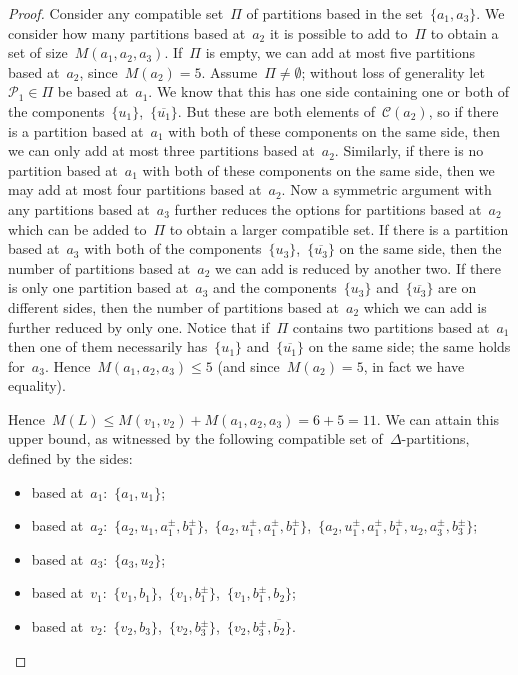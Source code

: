 \documentclass[11pt]{amsart}
\theoremstyle{definition}
\theoremstyle{definition}
\theoremstyle{definition}
\theoremstyle{definition}
\newcommand{\calC}{\mathcal{C}}
\newcommand{\calP}{\mathcal{P}} %
\begin{document}
\begin{proof}
Consider any compatible set~$\Pi$ of partitions based in the set~$\{a_1, a_3\}$. We consider how many partitions based at~$a_2$ it is possible to add to~$\Pi$ to obtain a set of size~$M(a_1, a_2, a_3)$. If~$\Pi$ is empty, we can add at most five partitions based at~$a_2$, since~$M(a_2) = 5$. Assume~$\Pi \neq \emptyset$; without loss of generality let~$\calP_1 \in \Pi$ be based at~$a_1$. We know that this has one side containing one or both of the components~$\{u_1\}$,~$\{\overline{u_1}\}$. But these are both elements of~$\calC(a_2)$, so if there is a partition based at~$a_1$ with both of these components on the same side, then we can only add at most three partitions based at~$a_2$. Similarly, if there is no partition based at~$a_1$ with both of these components on the same side, then we may add at most four partitions based at~$a_2$. Now a symmetric argument with any partitions based at~$a_3$ further reduces the options for partitions based at~$a_2$ which can be added to~$\Pi$ to obtain a larger compatible set. If there is a partition based at~$a_3$ with both of the components~$\{u_3\}$,~$\{\overline{u_3}\}$ on the same side, then the number of partitions based at~$a_2$ we can add is reduced by another two. If there is only one partition based at~$a_3$ and the components~$\{u_3\}$ and~$\{\overline{u_3}\}$ are on different sides, then the number of partitions based at~$a_2$ which we can add is further reduced by only one. Notice that if~$\Pi$ contains two partitions based at~$a_1$ then one of them necessarily has~$\{u_1\}$ and~$\{\overline{u_1}\}$ on the same side; the same holds for~$a_3$. Hence~$M(a_1, a_2, a_3) \leq 5$ (and since~$M(a_2) = 5$, in fact we have equality).

Hence~$M(L) \leq M(v_1, v_2) + M(a_1, a_2, a_3) = 6 + 5 = 11$. We can attain this upper bound, as witnessed by the following compatible set of~$\Delta$-partitions, defined by the sides:
\begin{itemize}
    \item based at~$a_1$:~$\{a_1, u_1\}$;
    \item based at~$a_2$:~$\{a_2, u_1, a_1^\pm, b_1^\pm\}$,~$\{a_2, u_1^\pm, a_1^\pm, b_1^\pm\}$,~$\{a_2, u_1^\pm, a_1^\pm, b_1^\pm, u_2, a_3^\pm, b_3^\pm\}$;
    \item based at~$a_3$:~$\{a_3, u_2\}$;
    \item based at~$v_1$:~$\{v_1, b_1\}$,~$\{v_1, b_1^\pm\}$,~$\{v_1, b_1^\pm, b_2\}$;
    \item based at~$v_2$:~$\{v_2, b_3\}$,~$\{v_2, b_3^\pm\}$,~$\{v_2, b_3^\pm, \overline{b_2}\}$.
\end{itemize}


\end{proof}
\end{document}
